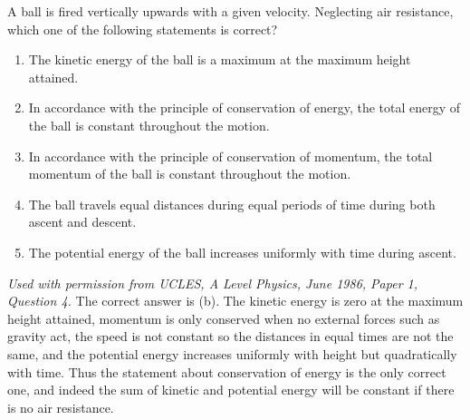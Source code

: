 \begin{problem}[A1986PIQ4l] 
{A ball is fired vertically upwards with a given velocity. Neglecting air resistance, which one of the following statements is correct?
\begin{enumerate}
	\item The kinetic energy of the ball is a maximum at the maximum height attained.
	\item In accordance with the principle of conservation of energy, the total energy of the ball is constant throughout the motion.
	\item In accordance with the principle of conservation of momentum, the total momentum of the ball is constant throughout the motion.
	\item The ball travels equal distances during equal periods of time during both ascent and descent.
	\item The potential energy of the ball increases uniformly with time during ascent.
\end{enumerate}
}
{\textit{Used with permission from UCLES, A Level Physics, June 1986, Paper 1, Question 4.}}
{The correct answer is (b). The kinetic energy is zero at the maximum height attained, momentum is only conserved when no external forces such as gravity act, the speed is not constant so the distances in equal times are not the same, and the potential energy increases uniformly with height but quadratically with time. Thus the statement about conservation of energy is the only correct one, and indeed the sum of kinetic and potential energy will be constant if there is no air resistance.}
\end{problem}